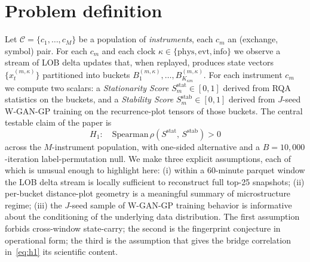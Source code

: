 \section{Problem definition}
\label{sec:problem}

Let $\mathcal{C} = \{c_1, \ldots, c_M\}$ be a population of
\emph{instruments}, each $c_m$ an (exchange, symbol) pair. For each
$c_m$ and each clock $\kappa \in \{\text{phys}, \text{evt},
\text{info}\}$ we observe a stream of LOB delta updates that, when
replayed, produces state vectors $\{x^{(m,\kappa)}_t\}$ partitioned
into buckets $B^{(m,\kappa)}_1, \ldots, B^{(m,\kappa)}_{K_{\kappa
m}}$. For each instrument $c_m$ we compute two scalars: a
\emph{Stationarity Score} $S^{\text{stat}}_m \in [0,1]$ derived from
RQA statistics on the buckets, and a \emph{Stability Score}
$S^{\text{stab}}_m \in [0,1]$ derived from $J$-seed W-GAN-GP training
on the recurrence-plot tensors of those buckets. The central testable
claim of the paper is
\begin{equation}
H_1:\quad \mathrm{Spearman}\,\rho\!\left(S^{\text{stat}},\,
S^{\text{stab}}\right) > 0
\label{eq:h1}
\end{equation}
across the $M$-instrument population, with one-sided alternative and a
$B = 10{,}000$-iteration label-permutation null. We make three
explicit assumptions, each of which is unusual enough to highlight
here: (i) within a 60-minute parquet window the LOB delta stream is
locally sufficient to reconstruct full top-25 snapshots; (ii)
per-bucket distance-plot geometry is a meaningful summary of
microstructure regime; (iii) the $J$-seed sample of W-GAN-GP training
behavior is informative about the conditioning of the underlying data
distribution. The first assumption forbids cross-window state-carry;
the second is the fingerprint conjecture in operational form; the
third is the assumption that gives the bridge correlation
in~\eqref{eq:h1} its scientific content.
